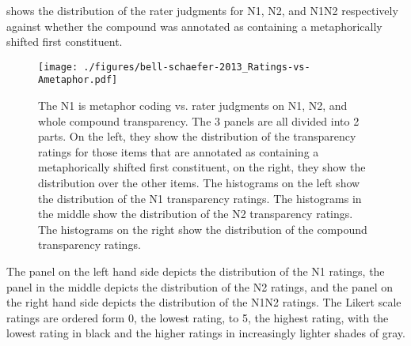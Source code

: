  shows the
distribution of the rater judgments for N1, N2, and N1N2
respectively against wheth\-er the compound was annotated as containing a
meta\-phorically shifted first constituent.
\begin{figure}[!htb]
  \centering
\texttt{[image: ./figures/bell-schaefer-2013\_Ratings-vs-Ametaphor.pdf]}  
  \caption{The N1 is metaphor coding vs. rater judgments on N1, N2,
    and whole compound transparency. The 3 panels are all
    divided into 2 parts. On the left, they
    show the distribution of the transparency ratings for those items
    that are annotated as containing a metaphorically shifted first
    constituent, on the right, they show the distribution over the
    other items. The histograms on the left show the distribution of
    the N1 transparency ratings. The histograms in the middle show the
    distribution of the N2 transparency ratings. The histograms on the
    right show the distribution of the compound transparency ratings.}
  \label{fig:bell&schaefer2013_ametaphor-ratings}
\end{figure}

\enlargethispage{1\baselineskip}
The panel on the left hand side depicts the distribution of the N1 ratings,
the panel in the middle depicts the distribution of the N2 ratings,
and the panel on the right hand side depicts the distribution of the
N1N2 ratings. The Likert scale ratings are ordered form 0, the lowest
rating, to 5, the highest rating, with the lowest rating in black and
the higher ratings in increasingly lighter shades of gray. 

